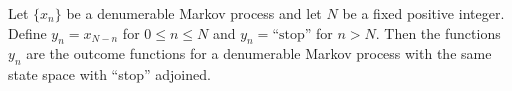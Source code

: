 Let $\{x_n\}$ be a denumerable Markov process and let $N$ be a fixed positive integer. Define $y_n = x_{N-n}$ for $0 \leq n \leq N$ and $y_n = \text{``stop''}$ for $n > N$. Then the functions $y_n$ are the outcome functions for a denumerable Markov process with the same state space with ``stop'' adjoined.
